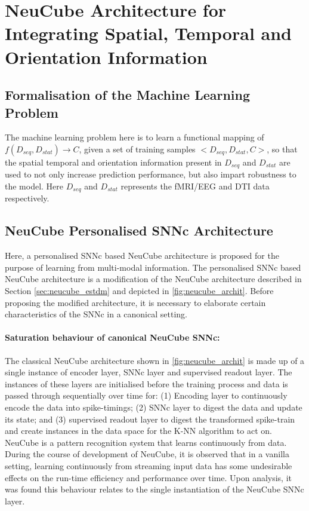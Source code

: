 \section{NeuCube Architecture for Integrating Spatial, Temporal and Orientation Information}

\subsection{Formalisation of the Machine Learning Problem}
The machine learning problem here is to learn a functional mapping of $f(D_{seq}, D_{stat})\rightarrow C$, given a set of training samples  $<D_{seq},D_{stat}, C>$, so that the spatial temporal and orientation information present in $D_{seq}$ and $D_{stat}$ are used to not only increase prediction performance, but also impart robustness to the model. Here $D_{seq}$ and $D_{stat}$ represents the fMRI/EEG and DTI data respectively.

\subsection{NeuCube Personalised SNNc Architecture}
\label{sec:neucube_person}
Here, a personalised SNNc based NeuCube architecture is proposed for the purpose of learning from multi-modal information. The personalised SNNc based NeuCube architecture is a modification of the NeuCube architecture described in Section \ref{sec:neucube_estdm} and depicted in \figurename \ref{fig:neucube_archit}. Before proposing the modified architecture, it is necessary to elaborate certain characteristics of the SNNc in a canonical setting.

\paragraph{Saturation behaviour of canonical NeuCube SNNc:} The classical NeuCube architecture shown in \figurename \ref{fig:neucube_archit} is made up of a single instance of encoder layer, SNNc layer and supervised readout layer. The instances of these layers are initialised before the training process and data is passed through sequentially over time for: (1) Encoding layer to continuously encode the data into spike-timings; (2) SNNc layer to digest the data and update its state; and (3) supervised readout layer to digest the transformed spike-train and create instances in the data space for the K-NN algorithm to act on. NeuCube is a pattern recognition system that learns continuously from data. During the course of development of NeuCube, it is observed that in a vanilla setting, learning continuously from streaming input data has some undesirable effects on the run-time efficiency and performance over time. Upon analysis, it was found this behaviour relates to the single instantiation of the NeuCube SNNc layer. 

